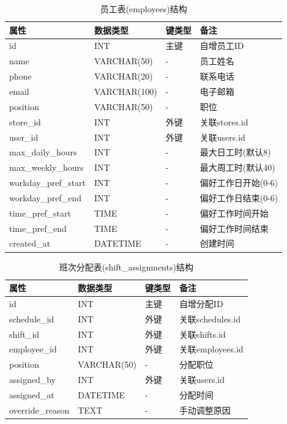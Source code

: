 \documentclass{ctexart}
\begin{document}
\begin{table}[H]
    \centering
    \caption{员工表(employees)结构}
    \label{tab:employees-table}
    \begin{tabular}{llll}
    \toprule
    属性 & 数据类型 & 键类型 & 备注 \\
    \midrule
    id & INT & 主键 & 自增员工ID \\
    name & VARCHAR(50) & - & 员工姓名 \\
    phone & VARCHAR(20) & - & 联系电话 \\
    email & VARCHAR(100) & - & 电子邮箱 \\
    position & VARCHAR(50) & - & 职位 \\
    store\_id & INT & 外键 & 关联stores.id \\
    user\_id & INT & 外键 & 关联users.id \\
    max\_daily\_hours & INT & - & 最大日工时(默认8) \\
    max\_weekly\_hours & INT & - & 最大周工时(默认40) \\
    workday\_pref\_start & INT & - & 偏好工作日开始(0-6) \\
    workday\_pref\_end & INT & - & 偏好工作日结束(0-6) \\
    time\_pref\_start & TIME & - & 偏好工作时间开始 \\
    time\_pref\_end & TIME & - & 偏好工作时间结束 \\
    created\_at & DATETIME & - & 创建时间 \\
    \bottomrule
    \end{tabular}
\end{table}

\begin{table}[H]
    \centering
    \caption{班次分配表(shift\_assignments)结构}
    \label{tab:shift-assignments-table}
    \begin{tabular}{llll}
    \toprule
    属性 & 数据类型 & 键类型 & 备注 \\
    \midrule
    id & INT & 主键 & 自增分配ID \\
    schedule\_id & INT & 外键 & 关联schedules.id \\
    shift\_id & INT & 外键 & 关联shifts.id \\
    employee\_id & INT & 外键 & 关联employees.id \\
    position & VARCHAR(50) & - & 分配职位 \\
    assigned\_by & INT & 外键 & 关联users.id \\
    assigned\_at & DATETIME & - & 分配时间 \\
    override\_reason & TEXT & - & 手动调整原因 \\
    \bottomrule
    \end{tabular}
\end{table}
\end{document}
